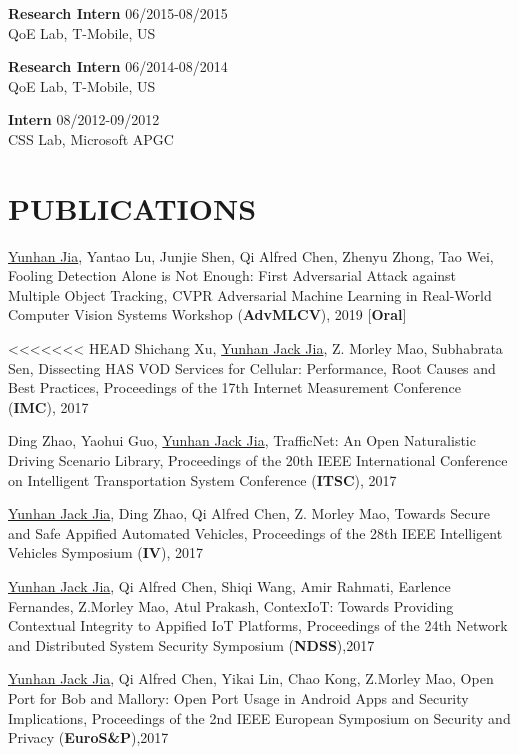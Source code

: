 \documentclass[margin]{res}
\begin{document}
\begin{resume}
\textbf{Research Intern} \hfill 06/2015-08/2015 \\
QoE Lab, T-Mobile, US

\textbf{Research Intern} \hfill 06/2014-08/2014 \\
QoE Lab, T-Mobile, US

\textbf{Intern} \hfill 08/2012-09/2012 \\
CSS Lab, Microsoft APGC


\section{PUBLICATIONS}
\underline{Yunhan Jia}, Yantao Lu, Junjie Shen, Qi Alfred Chen, Zhenyu Zhong, Tao Wei,
Fooling Detection Alone is Not Enough: First Adversarial Attack against Multiple Object Tracking, CVPR Adversarial Machine Learning in Real-World Computer Vision Systems Workshop (\textbf{AdvMLCV}), 2019 [\textbf{Oral}] \href{https://arxiv.org/pdf/1905.11026.pdf}{\color{blue}{[PDF]}}

<<<<<<< HEAD
Shichang Xu, \underline{Yunhan Jack Jia}, Z. Morley Mao, Subhabrata Sen,
Dissecting HAS VOD Services for Cellular: Performance, Root Causes and Best Practices, Proceedings of the 17th Internet Measurement Conference (\textbf{IMC}), 2017

Ding Zhao, Yaohui Guo, \underline{Yunhan Jack Jia}, 
TrafficNet: An Open Naturalistic Driving Scenario Library, Proceedings of the 20th IEEE International Conference on Intelligent Transportation System Conference (\textbf{ITSC}), 2017 \href{http://web.eecs.umich.edu/\~jackjia/material/trafficnet\_itsc17.pdf}{\color{blue}{[PDF]}}

\underline{Yunhan Jack Jia}, Ding Zhao, Qi Alfred Chen, Z. Morley Mao,
Towards Secure and Safe Appified Automated Vehicles, Proceedings of the 28th IEEE Intelligent Vehicles Symposium (\textbf{IV}), 2017 \href{https://arxiv.org/pdf/1702.06827.pdf}{\color{blue}{[PDF]}}

\underline{Yunhan Jack Jia}, Qi Alfred Chen, Shiqi Wang, Amir Rahmati, Earlence Fernandes, Z.Morley Mao, Atul Prakash, 
ContexIoT: Towards Providing Contextual Integrity to Appified IoT Platforms, Proceedings of the 24th Network and Distributed System Security Symposium (\textbf{NDSS}),2017 \href{http://web.eecs.umich.edu/\~jackjia/material/contexiot\_ndss17.pdf}{\color{blue}{[PDF]}}

\underline{Yunhan Jack Jia}, Qi Alfred Chen, Yikai Lin, Chao Kong, Z.Morley Mao, 
Open Port for Bob and Mallory: Open Port Usage in Android Apps and Security Implications, Proceedings of the 2nd IEEE European Symposium on Security and Privacy (\textbf{EuroS\&P}),2017 \href{http://web.eecs.umich.edu/\~jackjia/material/open\_euro17.pdf}{\color{blue}{[PDF]}}


\end{resume}
\end{document}

